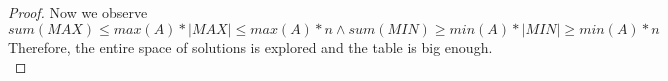 \begin{problem}
\begin{proof}
      Now we observe $sum(MAX) \leq max(A) * |MAX| \leq max(A) * n \land sum(MIN) \geq min(A) * |MIN| \geq min(A) * n$
      Therefore, the entire space of solutions is explored and the table is big enough. \\
  \end{proof}
  \noindent
\end{problem}
